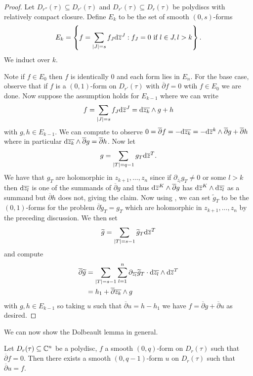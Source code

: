 \begin{proof}
    Let $D_{r''}(\tau)\subseteq D_{r'}(\tau)$ and $D_{r'}(\tau)\subseteq D_{r}(\tau)$ be polydiscs with relatively compact closure. Define $E_{k}$ to be the set of smooth $(0,s)$-forms 
    $$E_{k}=\left\{f=\sum_{|J|=s}f_{J}\mathrm{d}\overline{z}^{J}:f_{J}=0\text{ if }l\in J, l>k\right\}.$$
    We induct over $k$. 

    Note if $f\in E_{0}$ then $f$ is identically 0 and each form lies in $E_{n}$. For the base case, observe that if $f$ is a $(0,1)$-form on $D_{r'}(\tau)$ with $\overline{\partial}f=0$ wtih $f\in E_{0}$ we are done. Now suppose the assumption holds for $E_{k-1}$ where we can write 
    $$f=\sum_{|J|=s}f_{J}\mathrm{d}\overline{z}^{J}=\mathrm{d}\overline{z_{k}}\wedge g+h$$
    with $g,h\in E_{k-1}$. We can compute to observe $0=\overline{\partial}f=-\mathrm{d}\overline{z_{k}}=-\mathrm{d}\overline{z}^{k}\wedge\overline{\partial}g+\overline{\partial}h$ where in particular $\mathrm{d}\overline{z_{k}}\wedge\overline{\partial}g=\overline{\partial}h$. Now let 
    $$g=\sum_{|T|=q-1}g_{T}\mathrm{d}\overline{z}^{T}.$$
    We have that $g_{T}$ are holomorphic in $z_{k+1},\dots,z_{n}$ since if $\partial_{\overline{z_{l}}}g_{T}\neq0$ or some $l>k$ then $\mathrm{d}\overline{z_{l}}$ is one of the summands of $\overline{\partial }g$ and thus $\mathrm{d}\overline{z}^{K}\wedge\overline{\partial}g$ has $\mathrm{d}\overline{z}^{K}\wedge\mathrm{d}\overline{z_{l}}$ as a summand but $\overline{\partial}h$ does not, giving the claim. Now using , we can set $\widetilde{g}_{T}$ to be the $(0,1)$-forms for the problem $\overline{\partial}\widetilde{g}_{T}=g_{T}$ which are holomorphic in $z_{k+1},\dots,z_{n}$ by the preceding discussion. We then set 
    $$\widetilde{g}=\sum_{|T|=s-1}\widetilde{g}_{T}\mathrm{d}\overline{z}^{T}$$
    and compute 
    \begin{align*}
        \overline{\partial}\widetilde{g} &= \sum_{|T|=s-1}\sum_{l=1}^{n}\partial_{\overline{z_{l}}}\widetilde{g}_{T}\cdot\mathrm{d}\overline{z_{l}}\wedge\mathrm{d}\overline{z}^{T}\\
        &= h_{1}+\overline{\partial}\overline{z_{k}}\wedge g
    \end{align*}
    with $g,h\in E_{k-1}$ so taking $u$ such that $\overline{\partial}u=h-h_{1}$ we have $f=\overline{\partial}g+\overline{\partial}u$ as desired. 
\end{proof}
We can now show the Dolbeault lemma in general. 
\begin{theorem}\label{thm: Dolbeault lemma}
    Let $D_{r}(\tau)\subseteq\mathbb{C}^{n}$ be a polydisc, $f$ a smooth $(0,q)$-form on $D_{r}(\tau)$ such that $\overline{\partial}f=0$. Then there exists a smooth $(0,q-1)$-form $u$ on $D_{r}(\tau)$ such that $\overline{\partial}u=f$.
\end{theorem}

